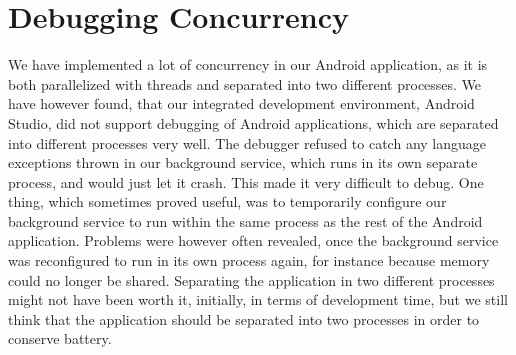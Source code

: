 
\section{Debugging Concurrency}
\label{sec:debugging_concurrency}

We have implemented a lot of concurrency in our Android application, as it is both parallelized with threads and separated into two different processes. We have however found, that our integrated development environment, Android Studio, did not support debugging of Android applications, which are separated into different processes very well. The debugger refused to catch any language exceptions thrown in our background service, which runs in its own separate process, and would just let it crash. This made it very difficult to debug. One thing, which sometimes proved useful, was to temporarily configure our background service to run within the same process as the rest of the Android application. Problems were however often revealed, once the background service was reconfigured to run in its own process again, for instance because memory could no longer be shared. Separating the application in two different processes might not have been worth it, initially, in terms of development time, but we still think that the application should be separated into two processes in order to conserve battery. 